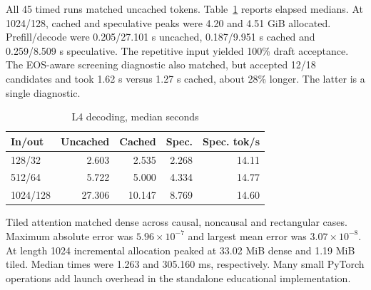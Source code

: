 \documentclass[conference]{IEEEtran}
\begin{document}
All 45 timed runs matched uncached tokens. Table~\ref{tab:decoding} reports elapsed medians. At 1024/128, cached and speculative peaks were 4.20 and 4.51 GiB allocated. Prefill/decode were 0.205/27.101 s uncached, 0.187/9.951 s cached and 0.259/8.509 s speculative. The repetitive input yielded 100\% draft acceptance. The EOS-aware screening diagnostic also matched, but accepted 12/18 candidates and took 1.62 s versus 1.27 s cached, about 28\% longer. The latter is a single diagnostic.
\begin{table}[t]
\centering\caption{L4 decoding, median seconds}\label{tab:decoding}
\setlength{\tabcolsep}{4pt}
\begin{tabular}{lrrrr}\toprule
In/out & Uncached & Cached & Spec. & Spec. tok/s\\\midrule
128/32 & 2.603 & 2.535 & 2.268 & 14.11\\
512/64 & 5.722 & 5.000 & 4.334 & 14.77\\
1024/128 & 27.306 & 10.147 & 8.769 & 14.60\\\bottomrule
\end{tabular}
\end{table}
Tiled attention matched dense across causal, noncausal and rectangular cases. Maximum absolute error was $5.96\times10^{-7}$ and largest mean error was $3.07\times10^{-8}$. At length 1024 incremental allocation peaked at 33.02 MiB dense and 1.19 MiB tiled. Median times were 1.263 and 305.160 ms, respectively. Many small PyTorch operations add launch overhead in the standalone educational implementation.
\end{document}

